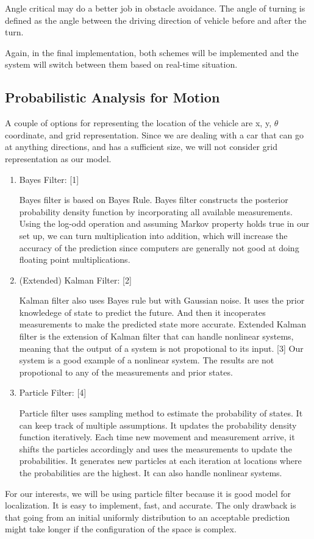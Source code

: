 \documentclass[compsoc,draftclsnofoot,onecolumn,10pt]{IEEEtran}
\begin{document}
Angle critical may do a better job in obstacle avoidance. The angle of turning is defined 
as the angle between the driving direction of vehicle before and after the turn.\par

Again, in the final implementation, both schemes will be implemented and the system will 
switch between them based on real-time situation.\par

\subsection{Probabilistic Analysis for Motion}

A couple of options for representing the location of the vehicle are x, y, $\theta$ coordinate,
and grid representation. Since we are dealing with a car that can go at anything directions, 
and has a sufficient size, we will not consider grid representation as our model.  
\begin{enumerate}
	\item Bayes Filter: [1]\par
	Bayes filter is based on Bayes Rule. Bayes filter constructs the posterior probability 
	density function by incorporating all available measurements. Using the log-odd operation 
	and assuming Markov property holds true in our set up, we can turn multiplication into 
	addition, which will increase the accuracy of the prediction since computers are generally 
	not good at doing floating point multiplications. 
	\item (Extended) Kalman Filter: [2]\par
	Kalman filter also uses Bayes rule but with Gaussian noise. It uses the prior knowledege 
	of state to predict the future. And then it incoperates measurements to make the predicted 
	state more accurate. Extended Kalman filter is the extension of Kalman filter that can 
	handle nonlinear systems, meaning that the output of a system is not propotional to its 
	input. [3] Our system is a good example of a nonlinear system. The results are not propotional 
	to any of the measurements and prior states.  
	\item Particle Filter: [4]\par
	Particle filter uses sampling method to estimate the probability of states. It can keep 
	track of multiple assumptions. It updates the probability density function iteratively. 
	Each time new movement and measurement arrive, it shifts the particles accordingly and 
	uses the measurements to update the probabilities. It generates new particles at each 
	iteration at locations where the probabilities are the highest. It can also handle 
	nonlinear systems. 
\end{enumerate}
For our interests, we will be using particle filter because it is good model for 
localization. It is easy to implement, fast, and accurate. The only drawback is that 
going from an initial uniformly distribution to an acceptable prediction might take 
longer if the configuration of the space is complex.
\end{document}
